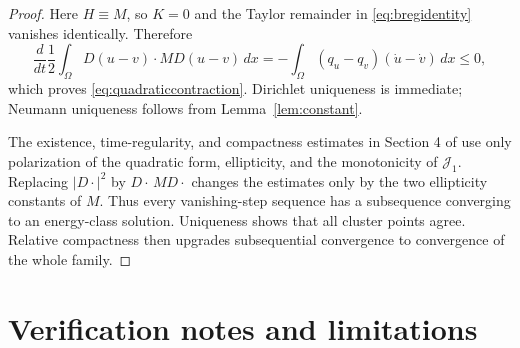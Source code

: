 \documentclass[11pt]{article}
\newcommand{\Om}{\Omega}
\newcommand{\J}{\mathcal J_1}
\begin{document}
\begin{proof}
Here $H\equiv M$, so $K=0$ and the Taylor remainder in
\eqref{eq:bregidentity} vanishes identically.  Therefore
\[
 \frac d{dt}\frac12\int_\Om D(u-v)\cdot M D(u-v)\,dx
 =-\int_\Om(q_u-q_v)(\dot u-\dot v)\,dx\le0,
\]
which proves \eqref{eq:quadraticcontraction}.  Dirichlet uniqueness is
immediate; Neumann uniqueness follows from Lemma~\ref{lem:constant}.

The existence, time-regularity, and compactness estimates in Section 4 of
\cite{CN} use only polarization of the quadratic form, ellipticity, and
the monotonicity of $\J$.  Replacing $|D\cdot|^2$ by
$D\cdot\,M D\cdot$ changes the estimates only by the two ellipticity
constants of $M$.  Thus every vanishing-step sequence has a subsequence
converging to an energy-class solution.  Uniqueness shows that all cluster
points agree.  Relative compactness then upgrades subsequential convergence
to convergence of the whole family.
\end{proof}

\section{Verification notes and limitations}
\end{document}
